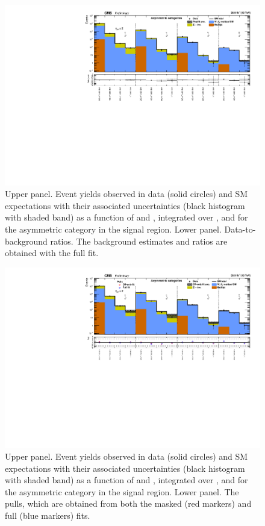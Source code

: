 \clearpage
\begin{figure}[h!]
  \centering
  \caption{Upper panel. Event yields observed in data (solid circles)
    and SM expectations with their associated uncertainties (black
    histogram with shaded band) as a function of \nb and \scalht,
    integrated over \mht, and for the asymmetric \njet category
    in the signal region. Lower panel. Data-to-background ratios. The
    background estimates and ratios are obtained with the full fit. }
  \label{fig:mr_asym_post}
  \includegraphics[width=1.\linewidth]{figures/results/36invfb/asym/summaryPlot_Asymmetric_fit_b}
\end{figure}

\clearpage
\begin{figure}[h!]
  \centering
  \caption{Upper panel. Event yields observed in data (solid circles)
    and SM expectations with their associated uncertainties (black
    histogram with shaded band) as a function of \nb and \scalht,
    integrated over \mht, and for the asymmetric \njet category
    in the signal region. Lower panel. The pulls, which are obtained
    from both the masked (red markers) and full (blue markers) fits. }
  \label{fig:mr_asym_pulls}
  \includegraphics[width=1.\linewidth]{figures/results/36invfb/asym/summaryPlot_Asymmetric_prefit_overlay_fit_b}
\end{figure}


